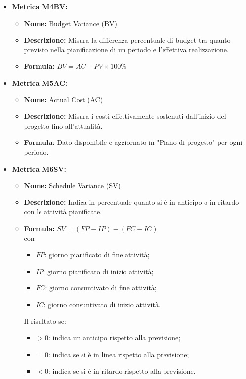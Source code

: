\begin{itemize}
    \item \textbf{Metrica M4BV:}
          \begin{itemize}
              \item \textbf{Nome:} Budget Variance (BV)
              \item \textbf{Descrizione:} Misura la differenza percentuale di budget tra quanto previsto nella pianificazione di un periodo e l’effettiva realizzazione.
              \item \textbf{Formula:} $BV = AC - PV \times 100\% $
          \end{itemize}

    \item \textbf{Metrica M5AC:}
          \begin{itemize}
              \item \textbf{Nome:} Actual Cost (AC)
              \item \textbf{Descrizione:} Misura i costi effettivamente sostenuti dall’inizio del progetto fino all’attualità.
              \item \textbf{Formula:} Dato disponibile e aggiornato in "Piano di progetto" per ogni periodo.
          \end{itemize}

    \item \textbf{Metrica M6SV:}
          \begin{itemize}
              \item \textbf{Nome:} Schedule Variance (SV)
              \item \textbf{Descrizione:} Indica in percentuale quanto si è in anticipo o in ritardo con le attività pianificate.
              \item \textbf{Formula:} $SV = (FP - IP) - (FC - IC)$
              \\con \begin{itemize}
                \item $FP$: giorno pianificato di fine attività;
                \item $IP$: giorno pianificato di inizio attività;
                \item $FC$: giorno consuntivato di fine attività;
                \item $IC$: giorno consuntivato di inizio attività.
            \end{itemize}
            
            Il risultato se:
            \begin{itemize}
                \item $> 0$: indica un anticipo rispetto alla previsione;
                \item $= 0$: indica se si è in linea rispetto alla previsione;
                \item $< 0$: indica se si è in ritardo rispetto alla previsione.
            \end{itemize}
          \end{itemize}


\end{itemize}
